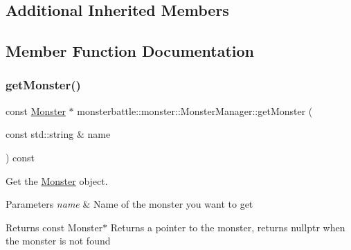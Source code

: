 \subsection*{Additional Inherited Members}


\subsection{Member Function Documentation}
\mbox{\label{classmonsterbattle_1_1monster_1_1MonsterManager_a276863d722569f349641b5cd43cdc6ff}} 
\subsubsection{\texorpdfstring{get\+Monster()}{getMonster()}}
{\footnotesize\ttfamily const \hyperlink{classmonsterbattle_1_1monster_1_1Monster}{Monster} $\ast$ monsterbattle\+::monster\+::\+Monster\+Manager\+::get\+Monster (\begin{DoxyParamCaption}\item[{const std\+::string \&}]{name }\end{DoxyParamCaption}) const}



Get the \hyperlink{classmonsterbattle_1_1monster_1_1Monster}{Monster} object. 


\begin{DoxyParams}{Parameters}
{\em name} & Name of the monster you want to get \\
\hline
\end{DoxyParams}
\begin{DoxyReturn}{Returns}
const Monster$\ast$ Returns a pointer to the monster, returns nullptr when the monster is not found 
\end{DoxyReturn}
\mbox{\label{classmonsterbattle_1_1monster_1_1MonsterManager_aebeb74b8fc365a1e4ee2baff335d9a83}} 
